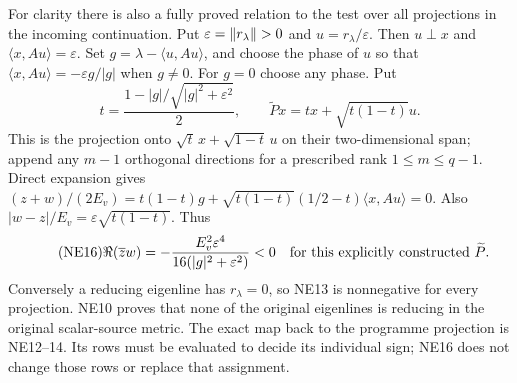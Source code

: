 \documentclass[11pt]{article}
\begin{document}
For clarity there is also a fully proved relation to the test over
all projections in the incoming continuation. Put
$\varepsilon=\lVert r_\lambda\rVert>0$ and
$u=r_\lambda/\varepsilon$. Then $u\perp x$ and
$\langle x,Au\rangle=\varepsilon$. Set
$g=\lambda-\langle u,Au\rangle$, and choose the phase of $u$ so that
$\langle x,Au\rangle=-\varepsilon g/|g|$ when $g\ne0$.
For $g=0$ choose any phase. Put
\[
t=\frac{1-|g|/\sqrt{|g|^2+\varepsilon^2}}2,
\qquad \widetilde P x=tx+\sqrt{t(1-t)}u.
\]
This is the projection onto $\sqrt t\,x+\sqrt{1-t}\,u$ on their
two-dimensional span; append any $m-1$ orthogonal directions for a
prescribed rank $1\le m\le q-1$. Direct expansion gives
$(z+w)/(2E_v)=t(1-t)g+\sqrt{t(1-t)}(1/2-t)\langle x,Au\rangle=0$.
Also $|w-z|/E_v=\varepsilon\sqrt{t(1-t)}$. Thus
\begin{equation}\tag{NE16}
\Re(\overline zw)=-\frac{E_v^2\varepsilon^4}
{16(|g|^2+\varepsilon^2)}<0
\quad\hbox{for this explicitly constructed }\widetilde P.
\end{equation}
Conversely a reducing eigenline has $r_\lambda=0$, so NE13 is
nonnegative for every projection. NE10 proves that none of the
original eigenlines is reducing in the original scalar-source metric.
The exact map back to the programme projection is NE12--14. Its rows
must be evaluated to decide its individual sign; NE16 does not change
those rows or replace that assignment.
\end{document}
